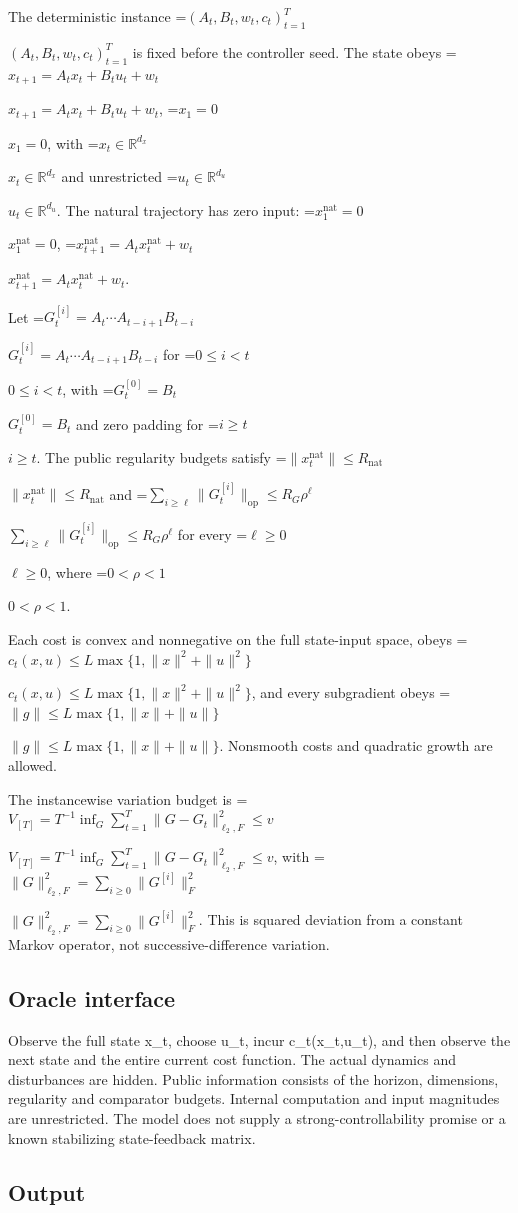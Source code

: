 \documentclass[10pt,a4paper]{article}
\newcommand{\AtlasMath}[1]{\par\begingroup\centering\setbox0=\hbox{$\displaystyle #1$}\ifdim\wd0>1.4\linewidth\typeout{ATLAS WIDE FORMULA: \the\wd0}\fi\ifdim\wd0>\linewidth\resizebox{\linewidth}{!}{\box0}\else\box0\fi\par\endgroup}
\newcommand{\AtlasInlineMath}[1]{\begingroup\setbox0=\hbox{$#1$}\ifdim\wd0>.4\linewidth\endgroup\AtlasMath{#1}\else\endgroup$#1$\fi}
\begin{document}
The deterministic instance \AtlasInlineMath{(A_t,B_t,w_t,c_t)_{t=1}^T} is fixed before the controller seed. The state obeys \AtlasInlineMath{x_{t+1}=A_tx_t+B_tu_t+w_t}, \AtlasInlineMath{x_1=0}, with \AtlasInlineMath{x_t\in\mathbb R^{d_x}} and unrestricted \AtlasInlineMath{u_t\in\mathbb R^{d_u}}. The natural trajectory has zero input: \AtlasInlineMath{x_1^{\mathrm{nat}}=0}, \AtlasInlineMath{x_{t+1}^{\mathrm{nat}}=A_tx_t^{\mathrm{nat}}+w_t}.



Let \AtlasInlineMath{G_t^{[i]}=A_t\cdots A_{t-i+1}B_{t-i}} for \AtlasInlineMath{0\le i<t}, with \AtlasInlineMath{G_t^{[0]}=B_t} and zero padding for \AtlasInlineMath{i\ge t}. The public regularity budgets satisfy \AtlasInlineMath{\|x_t^{\mathrm{nat}}\|\le R_{\mathrm{nat}}} and \AtlasInlineMath{\sum_{i\ge\ell}\|G_t^{[i]}\|_{\mathrm{op}}\le R_G\rho^\ell} for every \AtlasInlineMath{\ell\ge0}, where \AtlasInlineMath{0<\rho<1}.



Each cost is convex and nonnegative on the full state-input space, obeys \AtlasInlineMath{c_t(x,u)\le L\max\{1,\|x\|^2+\|u\|^2\}}, and every subgradient obeys \AtlasInlineMath{\|g\|\le L\max\{1,\|x\|+\|u\|\}}. Nonsmooth costs and quadratic growth are allowed.



The instancewise variation budget is \AtlasInlineMath{V_{[T]}=T^{-1}\inf_G\sum_{t=1}^T\|G-G_t\|_{\ell_2,F}^2\le v}, with \AtlasInlineMath{\|G\|_{\ell_2,F}^2=\sum_{i\ge0}\|G^{[i]}\|_F^2}. This is squared deviation from a constant Markov operator, not successive-difference variation.



\subsection{Oracle interface}


Observe the full state x\_t, choose u\_t, incur c\_t(x\_t,u\_t), and then observe the next state and the entire current cost function. The actual dynamics and disturbances are hidden. Public information consists of the horizon, dimensions, regularity and comparator budgets. Internal computation and input magnitudes are unrestricted. The model does not supply a strong-controllability promise or a known stabilizing state-feedback matrix.



\subsection{Output}
\end{document}
